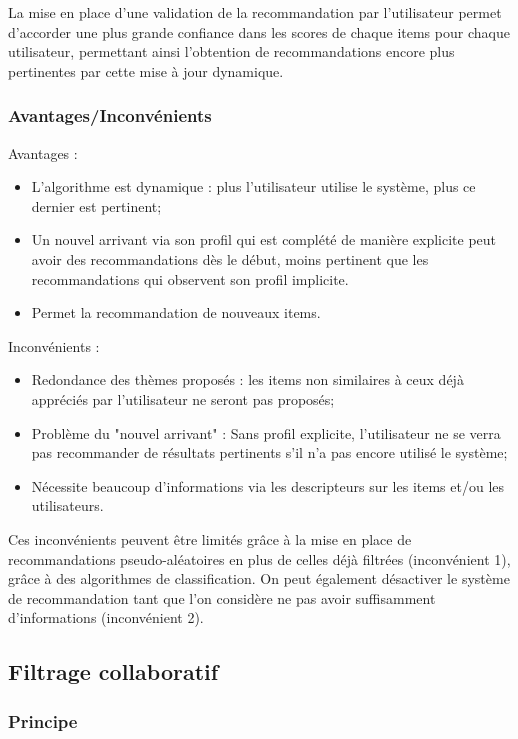 \documentclass{article}
\begin{document}
La mise en place d'une validation de la recommandation par l'utilisateur permet d'accorder une plus grande confiance dans les scores de chaque items pour chaque utilisateur, permettant ainsi l'obtention de recommandations encore plus pertinentes par cette mise à jour dynamique.


\subsubsection{Avantages/Inconvénients}

Avantages :
\begin{itemize}
    \item L'algorithme est dynamique : plus l'utilisateur utilise le système, plus ce dernier est pertinent;
    \item Un nouvel arrivant via son profil qui est complété de manière explicite peut avoir des recommandations dès le début, moins pertinent que les recommandations qui observent son profil implicite.
    \item Permet la recommandation de nouveaux items.
\end{itemize}
Inconvénients : 
\begin{itemize}
    \item Redondance des thèmes proposés : les items non similaires à ceux déjà appréciés par l'utilisateur ne seront pas proposés;
    \item Problème du "nouvel arrivant" : Sans profil explicite, l'utilisateur ne se verra pas recommander de résultats pertinents s'il n'a pas encore utilisé le système;
    \item Nécessite beaucoup d'informations via les descripteurs sur les items et/ou les utilisateurs.
\end{itemize}

Ces inconvénients peuvent être limités grâce à la mise en place de recommandations pseudo-aléatoires en plus de celles déjà filtrées (inconvénient 1), grâce à des algorithmes de classification. On peut également désactiver le système de recommandation tant que l'on considère ne pas avoir suffisamment d'informations (inconvénient 2).

\subsection{Filtrage collaboratif}

\subsubsection{Principe}
\end{document}

